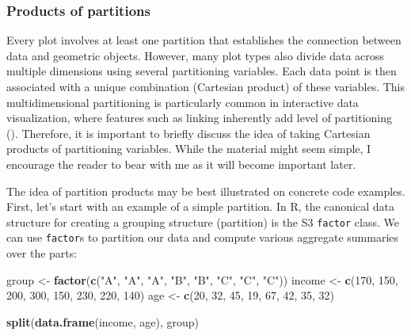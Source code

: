 \documentclass[
  openany]{book}
\newenvironment{Shaded}{\begin{snugshade}}{\end{snugshade}}
\newcommand{\DecValTok}[1]{\textcolor[rgb]{0.00,0.00,0.81}{#1}}
\newcommand{\FunctionTok}[1]{\textcolor[rgb]{0.13,0.29,0.53}{\textbf{#1}}}
\newcommand{\NormalTok}[1]{#1}
\newcommand{\OtherTok}[1]{\textcolor[rgb]{0.56,0.35,0.01}{#1}}
\newcommand{\StringTok}[1]{\textcolor[rgb]{0.31,0.60,0.02}{#1}}
\theoremstyle{definition}
\theoremstyle{definition}
\theoremstyle{definition}
\theoremstyle{definition}
\theoremstyle{remark}
\begin{document}
\subsubsection{Products of partitions}\label{products-of-partitions}

Every plot involves at least one partition that establishes the connection between data and geometric objects. However, many plot types also divide data across multiple dimensions using several partitioning variables. Each data point is then associated with a unique combination (Cartesian product) of these variables. This multidimensional partitioning is particularly common in interactive data visualization, where features such as linking inherently add level of partitioning (). Therefore, it is important to briefly discuss the idea of taking Cartesian products of partitioning variables. While the material might seem simple, I encourage the reader to bear with me as it will become important later.

The idea of partition products may be best illustrated on concrete code examples. First, let's start with an example of a simple partition. In R, the canonical data structure for creating a grouping structure (partition) is the S3 \texttt{factor} class. We can use \texttt{factor}s to partition our data and compute various aggregate summaries over the parts:

\begin{Shaded}
\begin{Highlighting}[]
\NormalTok{group }\OtherTok{\textless{}{-}} \FunctionTok{factor}\NormalTok{(}\FunctionTok{c}\NormalTok{(}\StringTok{"A"}\NormalTok{, }\StringTok{"A"}\NormalTok{, }\StringTok{"A"}\NormalTok{, }\StringTok{"B"}\NormalTok{, }\StringTok{"B"}\NormalTok{, }\StringTok{"C"}\NormalTok{, }\StringTok{"C"}\NormalTok{, }\StringTok{"C"}\NormalTok{))}
\NormalTok{income }\OtherTok{\textless{}{-}} \FunctionTok{c}\NormalTok{(}\DecValTok{170}\NormalTok{, }\DecValTok{150}\NormalTok{, }\DecValTok{200}\NormalTok{, }\DecValTok{300}\NormalTok{, }\DecValTok{150}\NormalTok{, }\DecValTok{230}\NormalTok{, }\DecValTok{220}\NormalTok{, }\DecValTok{140}\NormalTok{)}
\NormalTok{age }\OtherTok{\textless{}{-}} \FunctionTok{c}\NormalTok{(}\DecValTok{20}\NormalTok{, }\DecValTok{32}\NormalTok{, }\DecValTok{45}\NormalTok{, }\DecValTok{19}\NormalTok{, }\DecValTok{67}\NormalTok{, }\DecValTok{42}\NormalTok{, }\DecValTok{35}\NormalTok{, }\DecValTok{32}\NormalTok{)}

\FunctionTok{split}\NormalTok{(}\FunctionTok{data.frame}\NormalTok{(income, age), group)}
\end{Highlighting}
\end{Shaded}
\end{document}
